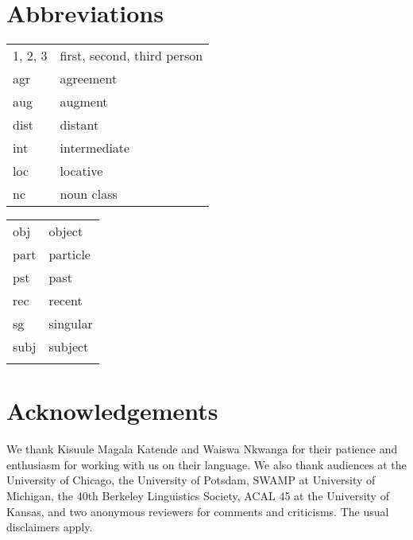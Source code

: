 \documentclass[output=paper,
modfonts
]{langscibook}
\begin{document}
\section*{Abbreviations}
\begin{tabularx}{.45\textwidth}{lQ}
1, 2, 3 & first, second, third person\\
 {\sc agr} & agreement\\
 {\sc aug} & augment\\
 {\sc dist} & distant\\
 {\sc int} & intermediate\\
 {\sc loc} & locative\\
 {\sc nc} &  {noun class}\\
 \end{tabularx}
\begin{tabularx}{.45\textwidth}{lQ}
 {\sc obj} & object\\
 {\sc part} & particle\\
 {\sc pst} & past\\
 {\sc rec} & recent\\
 {\sc sg} & singular\\
 {\sc subj} & subject\\
 \\
 \end{tabularx}




\section*{Acknowledgements}
We thank Kisuule Magala Katende and Waiswa Nkwanga for their patience and enthusiasm for working with us on their language. We also thank audiences at the University of Chicago, the University of Potsdam, SWAMP at University of Michigan, the 40th Berkeley Linguistics Society, ACAL 45 at the University of Kansas, and two anonymous reviewers for comments and criticisms. The usual disclaimers apply.

{\sloppy
\printbibliography[heading=subbibliography,notkeyword=this]
}
\end{document}
